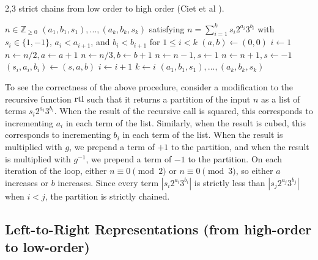 \documentclass{ucalgthes1}
\theoremstyle{definition}
\newcommand{\ZZgez}{\mathbb{Z}_{\ge 0}}
\begin{document}
\begin{algorithm}[htb]
\caption{2,3 strict chains from low order to high order (Ciet et al \cite{Ciet2006}).}
\label{alg:rtolDbnsChain}
\begin{algorithmic}[1]
\Require $n \in \ZZgez$
\Ensure $(a_1, b_1, s_1), ..., (a_k, b_k, s_k)$ satisfying $n = \sum_{i=1}^k s_i 2^{a_i} 3^{b_i}$ with $s_i \in \{1, -1\}$, $a_i < a_{i+1}$, and $b_i < b_{i+1}$ for $1 \le i < k$
\State $(a, b) \gets (0, 0)$
\State $i \gets 1$
		\State $n \gets n / 2, a \gets a + 1$
	\EndWhile
		\State $n \gets n / 3, b \gets b + 1$
	\EndWhile
		\State $n \gets n - 1, s \gets 1$
		\State $n \gets n + 1, s \gets -1$
	\EndIf
	\State $(s_i, a_i, b_i) \gets (s, a, b)$
	\State $i \gets i + 1$
\EndWhile
\State $k \gets i$
\State \Return $(a_1, b_1, s_1), ..., (a_k, b_k, s_k)$
\end{algorithmic}
\end{algorithm}


To see the correctness of the above procedure, consider a modification to the recursive function $\textrm{rtl}$ such that it returns a partition of the input $n$ as a list of terms $s_i2^{a_i}3^{b_i}$. When the result of the recursive call is squared, this corresponds to incrementing $a_i$ in each term of the list.  Similarly, when the result is cubed, this corresponds to incrementing $b_i$ in each term of the list. When the result is multiplied with $g$, we prepend a term of $+1$ to the partition, and when the result is multiplied with $g^{-1}$, we prepend a term of $-1$ to the partition. On each iteration of the loop, either $n \equiv 0 \pmod 2$ or $n \equiv 0 \pmod 3$, so either $a$ increases or $b$ increases. Since every term $|s_i2^{a_i}3^{b_i}|$ is strictly less than $|s_j2^{a_j}3^{b_j}|$ when $i < j$, the partition is strictly chained.


\subsection{Left-to-Right Representations (from high-order to low-order)}
\label{subsec:ltorChains}

\newcommand{\greedyltor}{\textrm{greedy}}
\newcommand{\greedychain}{\textrm{greedy}'}
\newcommand{\greedybound}{\textrm{greedy}''}
\newcommand{\closest}{\textrm{closest}}
\newcommand{\amax}{A}
\newcommand{\bmax}{B}
\end{document}
